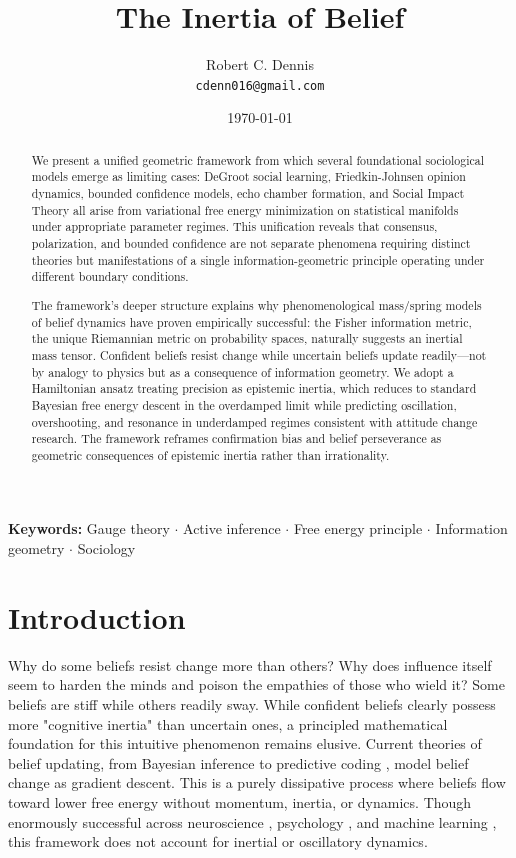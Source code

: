 \documentclass[12pt]{article}
\title{The Inertia of Belief}
\author{
Robert C. Dennis\\
\texttt{cdenn016@gmail.com}
}
\date{\today}
\begin{document}
\maketitle



\begin{abstract}
We present a unified geometric framework from which several foundational 
sociological models emerge as limiting cases: DeGroot social learning, 
Friedkin-Johnsen opinion dynamics, bounded confidence models, echo chamber 
formation, and Social Impact Theory all arise from variational free energy 
minimization on statistical manifolds under appropriate parameter regimes. 
This unification reveals that consensus, polarization, and bounded confidence 
are not separate phenomena requiring distinct theories but manifestations of 
a single information-geometric principle operating under different boundary 
conditions.

The framework's deeper structure explains why phenomenological mass/spring 
models of belief dynamics have proven empirically successful: the Fisher 
information metric, the unique Riemannian metric on probability spaces, 
naturally suggests an inertial mass tensor. Confident beliefs resist
change while uncertain beliefs update readily---not by analogy to physics but
as a consequence of information geometry. We adopt a Hamiltonian ansatz treating 
precision as epistemic inertia, which reduces to standard Bayesian free energy 
descent in the overdamped limit while predicting oscillation, overshooting, and 
resonance in underdamped regimes consistent with attitude change research. The 
framework reframes confirmation bias and belief perseverance as geometric 
consequences of epistemic inertia rather than irrationality.
\end{abstract}



\noindent\textbf{Keywords:} Gauge theory $\cdot$ Active inference $\cdot$ Free energy principle $\cdot$ Information geometry $\cdot$ Sociology

\section{Introduction}

Why do some beliefs resist change more than others? Why does influence itself seem to harden the minds and poison the empathies of those who wield it? Some beliefs are stiff while others readily sway. While confident beliefs clearly possess more "cognitive inertia" than uncertain ones, a principled mathematical foundation for this intuitive phenomenon remains elusive. Current theories of belief updating, from Bayesian inference \citet{jaynes2003probability} to predictive coding \citep{Friston2010,clark2013whatever}, model belief change as gradient descent. This is a purely dissipative process where beliefs flow toward lower free energy without momentum, inertia, or dynamics. Though enormously successful across neuroscience \citep{friston2016active}, psychology \citep{hohwy2013predictive}, and machine learning \citep{millidge2021predictive}, this framework does not account for inertial or oscillatory dynamics.
\end{document}
